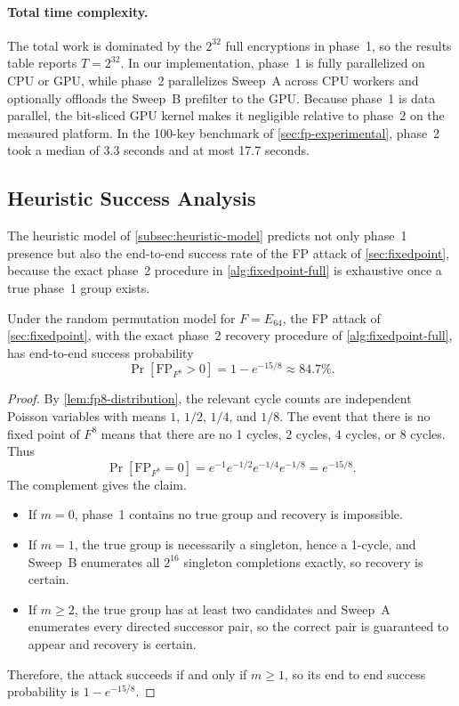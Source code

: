 \documentclass[version=preprint]{iacrcc}
\begin{document}
\paragraph{Total time complexity.}
The total work is dominated by the $2^{32}$ full encryptions in phase~1, so the results table reports $T = 2^{32}$.
In our implementation, phase~1 is fully parallelized on CPU or GPU, while phase~2 parallelizes Sweep~A across CPU workers and optionally offloads the Sweep~B prefilter to the GPU.
Because phase~1 is data parallel, the bit-sliced GPU kernel makes it negligible relative to phase~2 on the measured platform.
In the 100-key benchmark of \autoref{sec:fp-experimental}, phase~2 took a median of 3.3 seconds and at most 17.7 seconds.

\subsection{Heuristic Success Analysis}

The heuristic model of \autoref{subsec:heuristic-model} predicts not only phase~1 presence but also the end-to-end success rate of the FP attack of \autoref{sec:fixedpoint}, because the exact phase~2 procedure in \autoref{alg:fixedpoint-full} is exhaustive once a true phase~1 group exists.

\begin{theorem}\label{thm:fixedpoint-presence}
Under the random permutation model for $F = E_{64}$, the FP attack of \autoref{sec:fixedpoint}, with the exact phase~2 recovery procedure of \autoref{alg:fixedpoint-full}, has end-to-end success probability
\[
\Pr[\mathrm{FP}_{F^8} > 0] = 1 - e^{-15/8} \approx 84.7\%.
\]
\end{theorem}

\begin{proof}
By \autoref{lem:fp8-distribution}, the relevant cycle counts are independent Poisson variables with means $1$, $1/2$, $1/4$, and $1/8$.
The event that there is no fixed point of $F^8$ means that there are no 1 cycles, 2 cycles, 4 cycles, or 8 cycles.
Thus
\[
\Pr[\mathrm{FP}_{F^8}=0] = e^{-1} e^{-1/2} e^{-1/4} e^{-1/8} = e^{-15/8}.
\]
The complement gives the claim.

\begin{itemize}
  \item If $m = 0$, phase~1 contains no true group and recovery is impossible.
  \item If $m = 1$, the true group is necessarily a singleton, hence a 1-cycle, and Sweep~B enumerates all $2^{16}$ singleton completions exactly, so recovery is certain.
  \item If $m \geq 2$, the true group has at least two candidates and Sweep~A enumerates every directed successor pair, so the correct pair is guaranteed to appear and recovery is certain.
\end{itemize}

Therefore, the attack succeeds if and only if $m \geq 1$, so its end to end success probability is $1 - e^{-15/8}$.
\end{proof}
\end{document}
